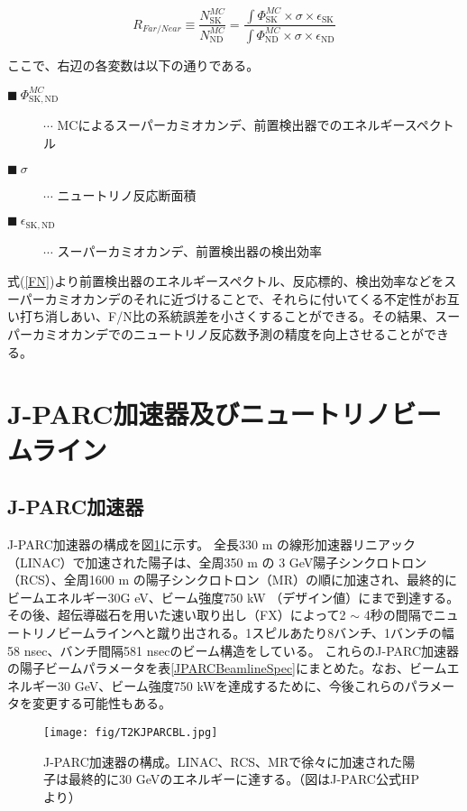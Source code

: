 \documentclass[11pt]{jreport}
\newcommand{\figref}[1]{図\ref{#1}}
\newcommand{\tabref}[1]{表\ref{#1}}
\newcommand{\equref}[1]{式(\ref{#1})}
\newcommand{\nd}{\mathrm{ND}}
\newcommand{\sk}{\mathrm{SK}}
\begin{document}
\begin{equation}
R_{Far/Near} \equiv \frac{N_{\sk}^{MC}}{N_{\nd}^{MC}} = \frac{\int \Phi_{\sk}^{MC} \times \sigma \times \epsilon_{\sk}}{\int \Phi_{\nd}^{MC} \times \sigma \times \epsilon_{\nd}}
\label{FN}
\end{equation}

ここで、右辺の各変数は以下の通りである。
\begin{description}
\item [$\blacksquare\ \Phi_{\sk, \nd}^{MC}$] $\cdots$ MCによるスーパーカミオカンデ、前置検出器でのエネルギースペクトル
\item [$\blacksquare\ \sigma$] $\cdots$ ニュートリノ反応断面積
\item [$\blacksquare\ \epsilon_{\sk, \nd}$] $\cdots$ スーパーカミオカンデ、前置検出器の検出効率
\end{description}

\equref{FN}より前置検出器のエネルギースペクトル、反応標的、検出効率などをスーパーカミオカンデのそれに近づけることで、それらに付いてくる不定性がお互い打ち消しあい、F/N比の系統誤差を小さくすることができる。その結果、スーパーカミオカンデでのニュートリノ反応数予測の精度を向上させることができる。



\section{J-PARC加速器及びニュートリノビームライン}

\subsection{J-PARC加速器}
J-PARC加速器の構成を\figref{JPARC}に示す。
全長330 m の線形加速器リニアック（LINAC）で加速された陽子は、全周350 m の 3 GeV陽子シンクロトロン（RCS）、全周1600 m の陽子シンクロトロン（MR）の順に加速され、最終的にビームエネルギー30G eV、ビーム強度750 kW （デザイン値）にまで到達する。
その後、超伝導磁石を用いた速い取り出し（FX）によって2 $\sim$ 4秒の間隔でニュートリノビームラインへと蹴り出される。1スピルあたり8バンチ、1バンチの幅58 nsec、バンチ間隔581 nsecのビーム構造をしている。
これらのJ-PARC加速器の陽子ビームパラメータを\tabref{JPARCBeamlineSpec}にまとめた。なお、ビームエネルギー30 GeV、ビーム強度750 kWを達成するために、今後これらのパラメータを変更する可能性もある。

\begin{figure}[htbp]
\centering
\texttt{[image: fig/T2KJPARCBL.jpg]}
\caption[J-PARC加速器の構成]{J-PARC加速器の構成。LINAC、RCS、MRで徐々に加速された陽子は最終的に30 GeVのエネルギーに達する。（図はJ-PARC公式HPより）}
\label{JPARC}
\end{figure}
\end{document}
